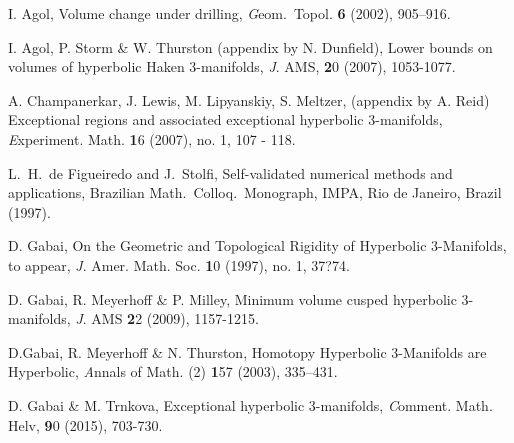 \def\bibline{\hbox to30pt{\hrulefill}}

\begin{thebibliography}{GHMTY}

 I. Agol, Volume change under drilling, {\textit Geom.\ Topol.\/} {\textbf 6} (2002), 905--916.


 I. Agol, P. Storm \& W. Thurston (appendix by N. Dunfield), Lower bounds on volumes of hyperbolic Haken 3-manifolds, {\textit J. AMS}, {\textbf 20} (2007), 1053-1077. 




 A. Champanerkar, J.  Lewis, M. Lipyanskiy, S. Meltzer, (appendix by A. Reid)
Exceptional regions and associated exceptional hyperbolic 3-manifolds, {\textit Experiment. Math.} {\textbf 16} (2007), no. 1, 107 - 118.



 L.\ H.\ de Figueiredo and J.\ Stolfi, Self-validated
numerical methods and applications, Brazilian Math.\  Colloq.\  Monograph, IMPA, Rio de Janeiro, Brazil (1997).

 
  
 

 D. Gabai, On the Geometric and Topological Rigidity of Hyperbolic 3-Manifolds,  to appear, {\textit J. Amer. Math. Soc.\/}  {\textbf 10} (1997), no. 1, 37?74.



 D. Gabai, R. Meyerhoff \& P. Milley, Minimum volume cusped hyperbolic 3-manifolds, {\textit J. AMS} {\textbf 22} (2009), 1157-1215.

 D.Gabai, R. Meyerhoff \& N. Thurston, Homotopy Hyperbolic 3-Manifolds are Hyperbolic, {\textit Annals of Math.} (2) {\textbf 157} (2003), 335--431.

 D. Gabai \& M. Trnkova, Exceptional hyperbolic 3-manifolds, {\textit Comment. Math. Helv}, {\textbf 90} (2015), 703-730.


\end{thebibliography}

